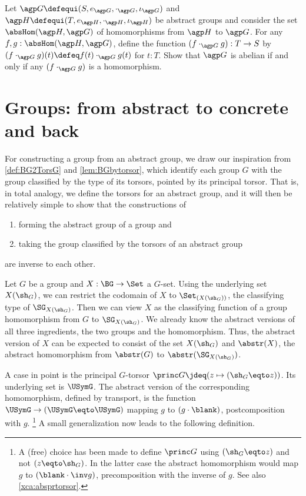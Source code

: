 \begin{xca}\label{xca:abs-homgroup}
Let $\agp G\defequi(S,e_{\agp G},\cdot_{\agp G},\iota_{\agp G})$
and $\agp H\defequi(T,e_{\agp H},\cdot_{\agp H},\iota_{\agp H})$
be abstract groups and consider the set $\absHom(\agp H,\agp G)$
of homomorphisms from $\agp H$ to $\agp G$.
For any $f,g: \absHom(\agp H,\agp G)$, define
the function $(f\cdot_{\agp G}g): T\to S$
by $(f\cdot_{\agp G}g)(t)\defeq f(t)\cdot_{\agp G}g(t)$ for $t:T$.
Show that $\agp G$ is abelian if and only if
any $(f\cdot_{\agp G}g)$ is a homomorphism.
\end{xca}

\section{Groups: from abstract to concrete and back}
\label{sec:Gsetforabstract}

For constructing a group from an abstract group, we draw our inspiration
from \cref{def:BG2TorsG} and \cref{lem:BGbytorsor},
which identify each group $G$ with the group classified by
the type of its torsors, pointed by its principal torsor.
That is, in total analogy, we define the torsors for an abstract group,
and it will then be relatively simple to show that the constructions of
\begin{enumerate}
\item forming the abstract group of a group and
\item taking the group classified by the torsors of an abstract group
\end{enumerate}
 are inverse to each other.

Let $G$ be a group and $X:\BG\to\Set$ a $G$-set. Using the
underlying set $X(\sh_G)$, we can restrict the
codomain of $X$ to $\Set_{(X(\sh_G))}$, the classifying type of 
$\SG_{X(\sh_G)}$. Then we can view $X$ as the classifying function of 
a group homomorphism from $G$ to $\SG_{X(\sh_G)}$.
We already know the abstract versions of all three ingredients,
the two groups and the homomorphism. Thus, the abstract version
of $X$ can be expected to consist of the set $X(\sh_G)$ and 
$\abstr(X)$, the abstract homomorphism from $\abstr(G)$ 
to $\abstr(\SG_{X(\sh_G)})$.

A case in point is the principal $G$-torsor $\princ G \jdeq
(z\mapsto (\sh_G\eqto z))$. Its underlying set is $\USymG$.
The abstract version of the corresponding homomorphism,
defined by transport, is the function $\USymG\to(\USymG\eqto\USymG)$
mapping $g$ to $(g\cdot\blank)$, \ie postcomposition with $g$.%
\footnote{\label{ft:choicePshG}A (free) choice has been made to define 
$\princ G$ using $(\sh_G\eqto z)$ and not $(z\eqto\sh_G)$. In the latter
case the abstract homomorphism would map $g$ to $(\blank\cdot\inv g)$, \ie
precomposition with the inverse of $g$. See also \cref{xca:absprtorsor}.}
A small generalization now leads to the following definition.


